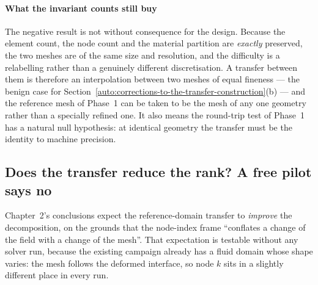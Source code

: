 \documentclass[11pt,a4paper]{article}
\newcommand{\vect}[1]{\mathbf{#1}}
\theoremstyle{plain}
\theoremstyle{definition}
\theoremstyle{remark}
\begin{document}

\label{rem:opt0-residual}
\paragraph{What the invariant counts still buy}
The negative result is not without consequence for the design. Because the
element count, the node count and the material partition are \emph{exactly}
preserved, the two meshes are of the same size and resolution, and the
difficulty is a relabelling rather than a genuinely different discretisation.
A transfer between them is therefore an interpolation between two meshes of
equal fineness --- the benign case for
Section~\ref{auto:corrections-to-the-transfer-construction}(b) --- and the reference mesh of Phase~1 can be taken to
be the mesh of any one geometry rather than a specially refined one. It also
means the round-trip test of Phase~1 has a natural null hypothesis: at
identical geometry the transfer must be the identity to machine precision.

\subsection{Does the transfer reduce the rank? A free pilot says no}
\label{sec:transfer-pilot}

Chapter~2's conclusions expect the reference-domain transfer to \emph{improve}
the decomposition, on the grounds that the node-index frame ``conflates a change
of the field with a change of the mesh''. That expectation is testable without
any solver run, because the existing campaign already has a fluid domain whose
shape varies: the mesh follows the deformed interface, so node $k$ sits in a
slightly different place in every run.
\end{document}
